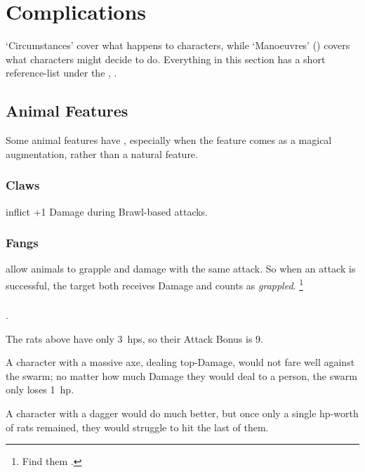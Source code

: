 \projectilesChart

\section{Complications}

`Circumstances' cover what happens to characters, while `Manoeuvres' () covers what characters might decide to do.
Everything in this section has a short reference-list under the , .

\begin{multicols}{2}

\subsection{Animal Features}

Some animal features have , especially when the feature comes as a magical augmentation, rather than a natural feature.

\subsubsection{Claws}
\label{claws}
inflict +1 Damage during Brawl-based attacks.

\subsubsection{Fangs}
\label{teeth}
\label{fangs}
allow animals to grapple and damage with the same attack.
So when an attack is successful, the target both receives Damage and counts as \textit{grappled}.%
\footnote{Find them .}

\subsubsection{}
.


\begin{exampletext}
  The rats above have only 3~\glspl{hp}, so their Attack Bonus is 9.

  A character with a massive axe, dealing top-Damage, would not fare well against the swarm; no matter how much Damage they would deal to a person, the swarm only loses 1~\gls{hp}.

  A character with a dagger would do much better, but once only a single \gls{hp}-worth of rats remained, they would struggle to hit the last of them.
\end{exampletext}


\end{multicols}
